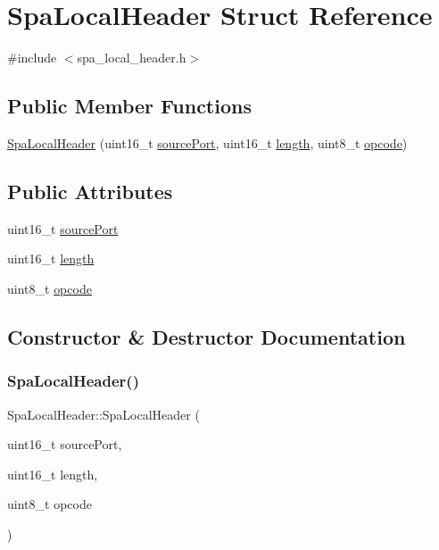 \hypertarget{structSpaLocalHeader}{}\section{Spa\+Local\+Header Struct Reference}
\label{structSpaLocalHeader}


{\ttfamily \#include $<$spa\+\_\+local\+\_\+header.\+h$>$}

\subsection*{Public Member Functions}
\begin{DoxyCompactItemize}
\item 
\hyperlink{structSpaLocalHeader_a75305564cd983142afd4f41bbe29a4bc}{Spa\+Local\+Header} (uint16\+\_\+t \hyperlink{structSpaLocalHeader_aae0d511805a74a60aea014a22aefe484}{source\+Port}, uint16\+\_\+t \hyperlink{structSpaLocalHeader_ab76a9a428b56a4e4a1107fb5eff646eb}{length}, uint8\+\_\+t \hyperlink{structSpaLocalHeader_a20fa821200ae49a2c91177f43c7446f4}{opcode})
\end{DoxyCompactItemize}
\subsection*{Public Attributes}
\begin{DoxyCompactItemize}
\item 
uint16\+\_\+t \hyperlink{structSpaLocalHeader_aae0d511805a74a60aea014a22aefe484}{source\+Port}
\item 
uint16\+\_\+t \hyperlink{structSpaLocalHeader_ab76a9a428b56a4e4a1107fb5eff646eb}{length}
\item 
uint8\+\_\+t \hyperlink{structSpaLocalHeader_a20fa821200ae49a2c91177f43c7446f4}{opcode}
\end{DoxyCompactItemize}


\subsection{Constructor \& Destructor Documentation}
\mbox{\label{structSpaLocalHeader_a75305564cd983142afd4f41bbe29a4bc}} 
\subsubsection{\texorpdfstring{Spa\+Local\+Header()}{SpaLocalHeader()}}
{\footnotesize\ttfamily Spa\+Local\+Header\+::\+Spa\+Local\+Header (\begin{DoxyParamCaption}\item[{uint16\+\_\+t}]{source\+Port,  }\item[{uint16\+\_\+t}]{length,  }\item[{uint8\+\_\+t}]{opcode }\end{DoxyParamCaption})\hspace{0.3cm}{\ttfamily [inline]}}



